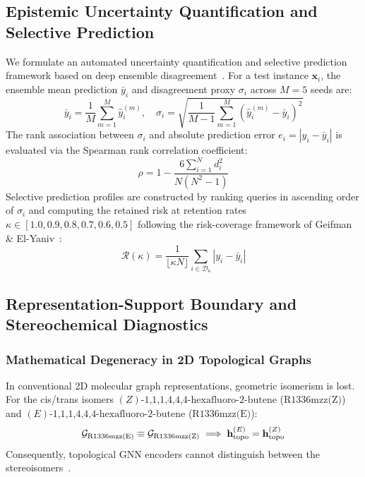 \subsection{Epistemic Uncertainty Quantification and Selective Prediction}
\label{subsec:uq_framework}

We formulate an automated uncertainty quantification and selective prediction framework based on deep ensemble disagreement~\cite{Lakshminarayanan2017_DeepEnsembles,Geifman2017_SelectiveNet}. For a test instance $\mathbf{x}_i$, the ensemble mean prediction $\bar{y}_i$ and disagreement proxy $\sigma_i$ across $M = 5$ seeds are:
\begin{equation}
    \bar{y}_i = \frac{1}{M} \sum_{m=1}^M \hat{y}_i^{(m)}, \quad \sigma_i = \sqrt{\frac{1}{M-1} \sum_{m=1}^M \left(\hat{y}_i^{(m)} - \bar{y}_i\right)^2}
\end{equation}
The rank association between $\sigma_i$ and absolute prediction error $e_i = |y_i - \bar{y}_i|$ is evaluated via the Spearman rank correlation coefficient:
\begin{equation}
    \rho = 1 - \frac{6 \sum_{i=1}^N d_i^2}{N(N^2 - 1)}
\end{equation}
Selective prediction profiles are constructed by ranking queries in ascending order of $\sigma_i$ and computing the retained risk at retention rates $\kappa \in [1.0, 0.9, 0.8, 0.7, 0.6, 0.5]$ following the risk-coverage framework of Geifman \& El-Yaniv~\cite{Geifman2017_SelectiveNet}:
\begin{equation}
    \mathcal{R}(\kappa) = \frac{1}{\lfloor \kappa N \rfloor} \sum_{i \in \mathcal{D}_{\kappa}} \left|y_i - \bar{y}_i\right|
\end{equation}

\subsection{Representation-Support Boundary and Stereochemical Diagnostics}
\label{subsec:stereo_boundary}

\subsubsection{Mathematical Degeneracy in 2D Topological Graphs}
In conventional 2D molecular graph representations, geometric isomerism is lost. For the cis/trans isomers $(Z)\text{-1,1,1,4,4,4-hexafluoro-2-butene}$ ($\text{R1336mzz(Z)}$) and $(E)\text{-1,1,1,4,4,4-hexafluoro-2-butene}$ ($\text{R1336mzz(E)}$):
\begin{equation}
    \mathcal{G}_{\text{R1336mzz(E)}} \equiv \mathcal{G}_{\text{R1336mzz(Z)}} \implies \mathbf{h}_{\rm topo}^{(E)} = \mathbf{h}_{\rm topo}^{(Z)}
\end{equation}
Consequently, topological GNN encoders cannot distinguish between the stereoisomers~\cite{Morehead2024_GCPNet,Adams2024_GeomComplete}.

